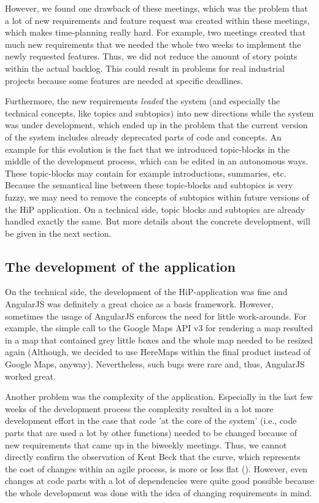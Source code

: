 However, we found one drawback of these meetings, which was the problem that a lot of new requirements and feature request was created within these meetings, which makes time-planning really hard. For example, two meetings created that much new requirements that we needed the whole two weeks to implement the newly requested features. Thus, we did not reduce the amount of story points within the actual backlog. This could result in problems for real industrial projects because some features are needed at specific deadlines.

Furthermore, the new requirements \emph{leaded} the system (and especially the technical concepts, like topics and subtopics) into new directions while the system was under development, which ended up in the problem that the current version of the system includes already deprecated parts of code and concepts. An example for this evolution is the fact that we introduced topic-blocks in the middle of the development process, which can be edited in an autonomous ways. These topic-blocks may contain for example introductions, summaries, etc. Because the semantical line between these topic-blocks and subtopics is very fuzzy, we may need to remove the concepts of subtopics within future versions of the \ac{HiP} application. On a technical side, topic blocks and subtopics are already handled exactly the same. But more details about the concrete development, will be given in the next section.

\subsection{The development of the application}
On the technical side, the development of the \ac{HiP}-application was fine and AngularJS was definitely a great choice as a basis framework. However, sometimes the usage of AngularJS enforces the need for little work-arounds. For example, the simple call to the Google Maps API v3 for rendering a map resulted in a map that contained grey little boxes and the whole map needed to be resized again (Although, we decided to use HereMaps within the final product instead of Google Maps, anyway). Nevertheless, such bugs were rare and, thus, AngularJS worked great. 

Another problem was the complexity of the application. Especially in the last few weeks of the development process the complexity resulted in a lot more development effort in the case that code 'at the core of the system' (i.e., code parts that are used a lot by other functions) needed to be changed because of new requirements that came up in the biweekly meetings. Thus, we cannot directly confirm the observation of Kent Beck that the curve, which represents the cost of changes within an agile process, is more or less flat (\cite{beck2003test}). However, even changes at code parts with a lot of dependencies were quite good possible because the whole development was done with the idea of changing requirements in mind. 

